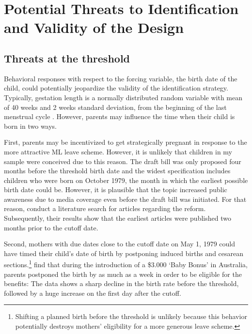 





\bigskip
\section*{Potential Threats to Identification and Validity of the Design}\label{sec_mlch:empirical_strategy_threats+validity}


\subsection*{Threats at the threshold}
Behavioral responses with respect to the forcing variable, the birth date of the child, could potentially jeopardize the validity of the identification strategy. Typically, gestation length is a normally distributed random variable with mean of 40 weeks and 2 weeks standard deviation, from the beginning of the last menstrual cycle \citep{Ekberg2013parental}. However, parents may influence the time when their child is born in two ways. 

First, parents may be incentivized to get strategically pregnant in response to the more attractive ML leave scheme. However, it is unlikely that children in my sample were conceived due to this reason. The draft bill was only proposed four months before the threshold birth date and the widest specification includes children who were born on October 1979, the month in which the earliest possible birth date could be. However, it is plausible that the topic increased public awareness due to media coverage even before the draft bill was initiated. For that reason, \cite{Dustmann2012} conduct a literature search for articles regarding the reform. Subsequently, their results show that the earliest articles were published two months prior to the cutoff date.

Second, mothers with due dates close to the cutoff date on May 1, 1979 could have timed their child's date of birth by postponing induced births and cesarean sections.\footnote{Shifting a planned birth before the threshold is unlikely because this behavior potentially destroys mothers' eligibility for a more generous leave scheme.} \cite{gans2009born} find that during the introduction of a \$3.000 `Baby Bonus' in Australia, parents postponed the birth by as much as a week in order to be eligible for the benefits: The data shows a sharp decline in the birth rate before the threshold, followed by a huge increase on the first day after the cutoff.

